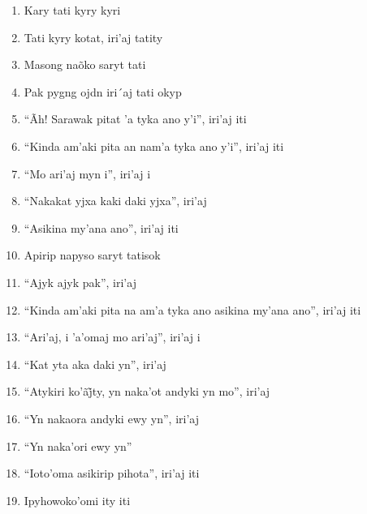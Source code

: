 \begin{enumerate}
 \item Kary tati kyry kyri

 \item Tati kyry kotat, iri'aj tatity

 \begin{center}\end{center}

 \item Masong naõko saryt tati

 \item Pak pygng ojdn iri´aj tati okyp

 \item ``Ãh! Sarawak pitat 'a tyka ano y'i'', iri'aj iti

 \item ``Kinda am'aki pita an nam'a tyka ano y'i'', iri'aj iti

 \item ``Mo ari'aj myn i'', iri'aj i

 \item ``Nakakat yjxa kaki daki yjxa'', iri'aj

 \item ``Asikina my'ana ano'', iri'aj iti

 \item Apirip napyso saryt tatisok

 \item ``Ajyk ajyk pak'', iri'aj

 \item ``Kinda am'aki pita na am'a tyka ano asikina my'ana ano'', iri'aj iti

 \item ``Ari'aj, i 'a'omaj mo ari'aj'', iri'aj i

 \item ``Kat yta aka daki yn'', iri'aj

 \begin{center}\end{center}

 \item ``Atykiri ko’ãj̃ty, yn naka’ot andyki yn mo'', iri’aj

 \item ``Yn nakaora andyki ewy yn'', iri'aj

 \item ``Yn naka'ori ewy yn''

 \item ``Ioto'oma asikirip pihota'', iri'aj iti

 \item Ipyhowoko'omi ity iti


\end{enumerate}
